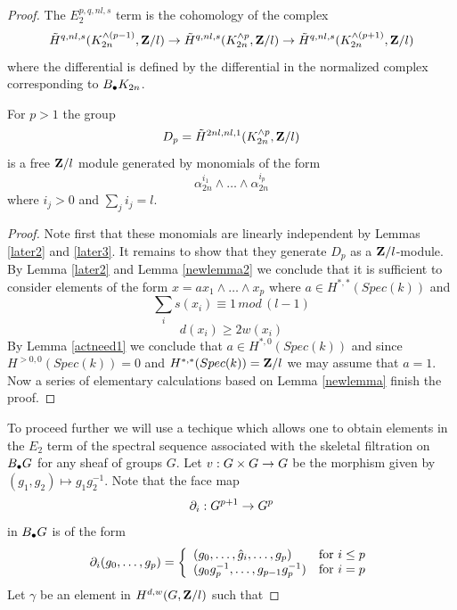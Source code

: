 \documentclass[11pt]{article}
\begin{document}
\begin{proof}
The $E_2^{p,q,nl,s}$ term is the cohomology of the complex
%
$$\tilde{H}^{q,nl,s}(K_{2n}^{\wedge(p-1)},{\bf Z\rm}/l)\rightarrow
\tilde{H}^{q,nl,s}(K_{2n}^{\wedge p},{\bf Z\rm}/l)\rightarrow
\tilde{H}^{q,nl,s}(K_{2n}^{\wedge (p+1)},{\bf Z\rm}/l)$$
%
where the differential is defined by the differential in the normalized
complex corresponding to $B_{\bullet} K_{2n}$. 
%
%
\begin{lemma}
For $p>1$ the group
%
$$D_p=\tilde{H}^{2nl,nl,1}(K_{2n}^{\wedge p},{\bf Z\rm}/l)$$
%
is a free ${\bf Z\rm}/l$ module generated by monomials of the form
%
$$\alpha_{2n}^{i_1}\wedge\dots\wedge\alpha_{2n}^{i_p}$$
%
where $i_j>0$ and $\sum_j i_j=l$. 
\end{lemma}
%
\begin{proof}
Note first that these monomials are linearly independent by Lemmas
\ref{later2} and \ref{later3}. It remains to show that they generate
$D_p$ as a ${\bf Z\rm}/l$-module.  By Lemma \ref{later2} and Lemma \ref{newlemma2} we conclude that it is sufficient to consider elements of the form $x=a x_1\wedge\dots\wedge x_p$ where $a\in H^{*,*}(Spec(k))$ and 
%
$$\sum_i s(x_i)\equiv 1\, mod\, (l-1)$$
$$d(x_i)\ge 2w(x_i)$$
%
By Lemma \ref{actneed1} we conclude that $a\in H^{*,0}(Spec(k))$ and since $H^{>0,0}(Spec(k))=0$ and $H^{*,*}(Spec(k))={\bf Z\rm}/l$ we may assume that $a=1$. Now a series of elementary calculations based on Lemma \ref{newlemma} finish the proof.
\end{proof}
%
To proceed further we will use a techique which allows one to obtain
elements in the $E_2$ term of the spectral sequence associated with
the skeletal filtration on $B_{\bullet} G$ for any sheaf of groups $G$.
Let $v:G\times G\rightarrow G$ be the morphism given by $(g_1,g_2)\mapsto g_1
g_2^{-1}$. Note that the face map
%
$$\partial_i:G^{p+1}\rightarrow G^p$$
%
in $B_{\bullet} G$ is of the form
%
$$
\partial_i(g_0,\dots,g_{p})=\left\{
\begin{array}{ll}
(g_0,\dots,\hat{g}_i,\dots,g_p)&\mbox{\rm  for $i\le p$}\\
(g_0g_p^{-1},\dots, g_{p-1}g_{p}^{-1})&\mbox{\rm  for $i=p$}
\end{array}
\right. 
$$
%
Let $\gamma$ be an element in $H^{d,w}(G,{\bf Z\rm}/l)$ such that

\end{proof}
\end{document}
